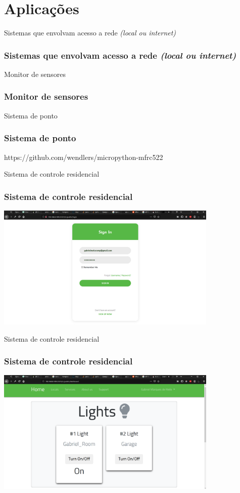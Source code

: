 \documentclass[10pt, compress]{beamer}
\begin{document}
\section{Aplicações}

\begin{frame}{Sistemas que envolvam acesso a rede \textit{(local ou internet)}}
  \frametitle{Sistemas que envolvam acesso a rede \textit{(local ou internet)}}
\end{frame}

\begin{frame}{Monitor de sensores}
  \frametitle{Monitor de sensores}
\end{frame}

\begin{frame}{Sistema de ponto}
  \frametitle{Sistema de ponto}
  https://github.com/wendlers/micropython-mfrc522
\end{frame}

\begin{frame}{Sistema de controle residencial}
  \frametitle{Sistema de controle residencial}
  \includegraphics[width=300pt]{images/iot-server_login.png}
\end{frame}

\begin{frame}{Sistema de controle residencial}
  \frametitle{Sistema de controle residencial}
  \includegraphics[width=300pt]{images/iot-server_dash1.png}
\end{frame}
\end{document}
